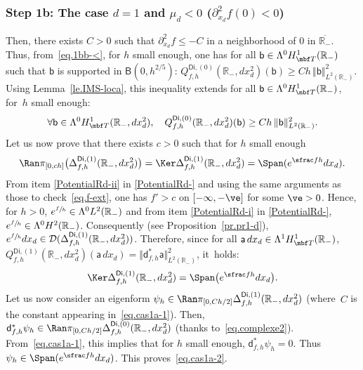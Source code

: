 \subsubsection*{Step 1b: The case $d=1$ and $\mu_{d}<0$ (\ie $ \partial_{x_d}^2 f(0)<0$)}
Then, there exists $C>0$ such that $\partial_{x_d}^2 f\le -C$ in a neighborhood of $0$ in $\overline{\mathbb R_-}$. Thus, from~\eqref{eq.1bb-<}, for $h$ small enough, one has for all $\mathsf b\in \Lambda^0 H^1_{\mbf T}(\mathbb R_-)$ such that $\mathsf b$ is supported in $\mathsf B(0,h^{2/5 })$: $
Q_{f,h}^{\mathsf{Di},(0)}(\mathbb R_-, dx_d^2)(\mathsf b)\ge C h\, \Vert \mathsf b \Vert_{L^2(\mathbb R_-)}^2$.
Using Lemma~\ref{le.IMS-loca}, this inequality extends for all $\mathsf b\in \Lambda^0 H^1_{\mbf T}(\mathbb R_-)$, \ie for~$h$ small enough:
\begin{equation}\label{eq.cas1a-1}
\forall \mathsf b\in \Lambda^0 H^1_{\mbf T}(\mathbb R_-, dx_d^2),\quad Q_{f,h}^{\mathsf{Di},(0)}(\mathbb R_-, dx_d^2)(\mathsf b)\ge Ch\, \Vert \mathsf b \Vert_{L^2(\mathbb R_-)}^2.
\end{equation}
Let us now prove that there exists $c>0$ such that for $h$ small enough
\begin{equation}\label{eq.cas1a-2}
\Ran \pi_{[0,ch]}\bigl(\Delta_{f,h}^{\mathsf{Di},(1)}(\mathbb R_-, dx_d^2)\bigr)=\Ker \Delta_{f,h}^{\mathsf{Di},(1)}(\mathbb R_-, dx_d^2) = \Span (e^{\sfrac fh}dx_d).
\end{equation}
From item \eqref{PotentialRd-ii} in \ref{PotentialRd-} and using the same
arguments as those to check~\eqref{eq.f-ext}, one has $f'>c$ on $[-\infty, -\ve]$ for some $\ve>0$. Hence, for $h>0$, $e^{\sfrac fh}\in \Lambda^0L^2(\mathbb R_-)$ and from item \eqref{PotentialRd-i} in \ref{PotentialRd-}, $e^{\sfrac fh}\in \Lambda^0H^2(\mathbb R_-)$. Consequently (see Proposition~\ref{pr.pr1-d}), $e^{\sfrac fh}dx_d\in \mathcal D(\Delta_{f,h}^{\mathsf{Di},(1)}(\mathbb R_-, dx_d^2))$.
Therefore, since for all $\mathsf a \, dx_d\in \Lambda^1 H^1_{\mbf T}(\mathbb R_-)$, $Q_{f,h}^{\mathsf{Di},(1)}(\mathbb R_-, dx_d^2)(\mathsf a \, dx_d)= \Vert \mathsf d^*_{f,h} \mathsf a \Vert_{L^2(\mathbb R_-)}^2$, it~holds:
\[
\Ker \Delta_{f,h}^{\mathsf{Di},(1)}(\mathbb R_-,dx_d^2) = \Span \bigl(e^{\sfrac fh}dx_d\bigr).
\]
Let us now consider an eigenform $\psi_h\in \Ran \pi_{[0,Ch/2]}
\Delta_{f,h}^{\mathsf{Di},(1)}(\mathbb R _-,dx_d^2) $ (where~$C$
is the constant appearing in~\eqref{eq.cas1a-1}). Then, $\mathsf
d_{f,h}^* \psi_h \in \Ran \pi_{[0,Ch/2]}
\Delta_{f,h}^{\mathsf{Di},(0)}(\mathbb R_-,dx_d^2) $ (thanks
to~\eqref{eq.complexe2}). From~\eqref{eq.cas1a-1}, this implies that
for $h$ small enough, $\mathsf d^*_{f,h} \psi_h=0$. Thus $\psi_h\in
\Span (e^{\sfrac fh} dx_d)$. This proves~\eqref{eq.cas1a-2}.

